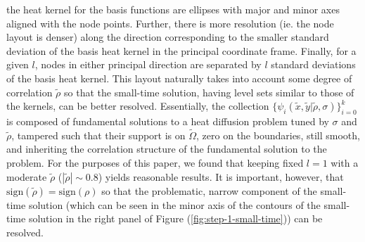 the heat kernel for the basis functions are ellipses with major and
minor axes aligned with the node points. Further, there is more
resolution (ie. the node layout is denser) along the direction
corresponding to the smaller standard deviation of the basis heat
kernel in the principal coordinate frame. Finally, for a given $l$,
nodes in either principal direction are separated by $l$ standard
deviations of the basis heat kernel. This layout naturally takes into
account some degree of correlation $\tilde{\rho}$ so that the
small-time solution, having level sets similar to those of the
kernels, can be better resolved. Essentially, the collection
$\{ \psi_i(\tilde{x},\tilde{y}| \tilde{\rho}, \sigma) \}_{i=0}^k$ is
composed of fundamental solutions to a heat diffusion problem tuned by
$\sigma$ and $\tilde{\rho}$, tampered such that their support is on
$\tilde{\Omega}$, zero on the boundaries, still smooth, and inheriting
the correlation structure of the fundamental solution to the
problem. For the purposes of this paper, we found that keeping
fixed $l=1$ with a moderate $\tilde{\rho}$ ($|\tilde{\rho}| \sim 0.8$)
yields reasonable results. It is important, however, that
$\mbox{sign}(\tilde{\rho}) = \mbox{sign}(\rho)$ so that the
problematic, narrow component of the small-time solution (which can be
seen in the minor axis of the contours of the small-time solution in
the right panel of Figure (\ref{fig:step-1-small-time})) can be
resolved.
%
%
%

